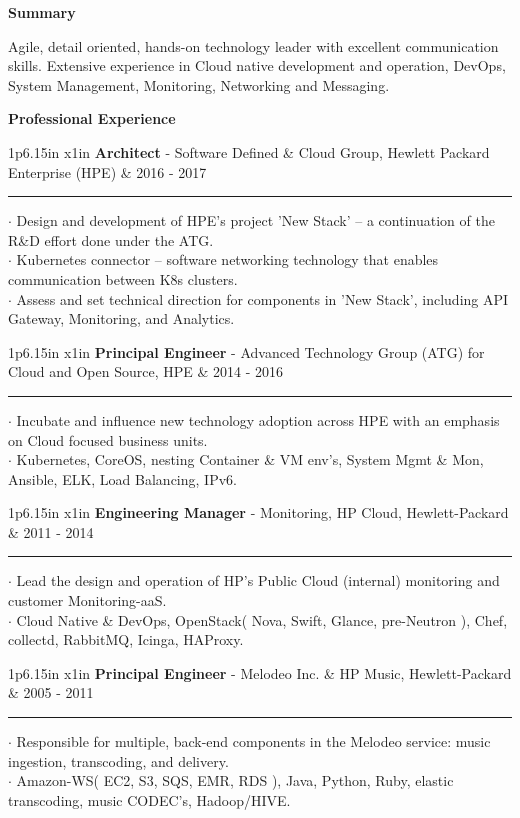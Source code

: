 \documentclass[10pt]{article}
\newcommand{\cvsection}[1]
{
	\begin{center}
		\large\textcolor{sectcol}{\textbf{#1}}
	\end{center}
}
\newcommand{\cveventtwo}[5]
{

\begin{tabular*}{1\textwidth}{p{6.15in}  x{1in}}
	\textbf{#2} - \textcolor{bgcol}{#3} &   \vspace{2.5pt}\textcolor{sectcol}{#1}
\end{tabular*}

\vspace{-8pt}
\textcolor{softcol}{\hrule}
\vspace{6pt}

  $\cdot$ #4\\[3pt]
  $\cdot$ #5\\[6pt]

}
\newcommand{\cveventthree}[6]
{

\begin{tabular*}{1\textwidth}{p{6.15in}  x{1in}}
	\textbf{#2} - \textcolor{bgcol}{#3} &   \vspace{2.5pt}\textcolor{sectcol}{#1}
\end{tabular*}

\vspace{-8pt}
\textcolor{softcol}{\hrule}
\vspace{6pt}

  $\cdot$ #4\\[3pt]
  $\cdot$ #5\\[3pt]
  $\cdot$ #6\\[6pt]

}
\begin{document}
\vspace{-6pt}
\cvsection{Summary}
Agile, detail oriented, hands-on technology leader with excellent
communication skills.  Extensive experience in Cloud native
development and operation, DevOps, System Management, Monitoring,
Networking and Messaging.

%
%

\cvsection{Professional Experience}

%
\cveventthree{2016 - 2017}{Architect}{Software Defined \& Cloud Group, Hewlett Packard Enterprise (HPE)}
{Design and development of HPE's project 'New Stack' -- a continuation of the R\&D effort done under the ATG.}
{Kubernetes connector -- software networking technology that enables communication between K8s clusters.}
{Assess and set technical direction for components in 'New Stack', including API Gateway, Monitoring, and Analytics.}

%
\cveventtwo{2014 - 2016}{Principal Engineer}{Advanced Technology Group
  (ATG) for Cloud and Open Source, HPE}
{Incubate and influence new technology adoption across HPE with an
  emphasis on Cloud focused business units.}
{Kubernetes, CoreOS, nesting Container \& VM env's, System Mgmt \&
  Mon, Ansible, ELK, Load Balancing, IPv6.}

%
\cveventtwo{2011 - 2014}{Engineering Manager}{Monitoring, HP Cloud, Hewlett-Packard}
{Lead the design and operation of HP's Public Cloud (internal) monitoring and
  customer Monitoring-aaS.}
{Cloud Native \& DevOps, OpenStack( Nova, Swift, Glance, pre-Neutron
  ), Chef, collectd, RabbitMQ, Icinga, HAProxy.}

%
\cveventtwo{2005 - 2011}{Principal Engineer}{Melodeo Inc. \& HP Music, Hewlett-Packard}
{Responsible for multiple, back-end components in the Melodeo service:
  music ingestion, transcoding, and delivery.}
{Amazon-WS( EC2, S3, SQS, EMR, RDS ), Java, Python, Ruby, elastic
  transcoding, music CODEC's, Hadoop/HIVE.}
\end{document}
